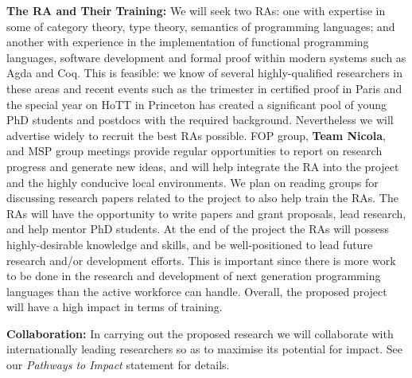 \documentclass[a4paper,11pt]{article}
\begin{document}
{\bf The RA and Their Training:} We will seek two RAs: one with
expertise in some of category theory, type theory, semantics of
programming languages; and another with experience in the
implementation of functional programming languages, software
development and formal proof within modern systems such as Agda and
Coq. This is feasible: we know of several highly-qualified researchers
in these areas and recent events such as the trimester in certified
proof in Paris and the special year on HoTT in Princeton has created a
significant pool of young PhD students and postdocs with the required
background. Nevertheless we will advertise widely to recruit the best RAs
possible. %
FOP group, {\bf Team Nicola}, and MSP group meetings
provide regular opportunities to report on research 
progress and generate new ideas, and will help integrate the RA into
the project and the highly conducive local environments.
We plan on reading groups for discussing research
papers 
related to the project to also help train the RAs. The RAs will have
the opportunity to write papers and grant proposals, lead research,
and help mentor PhD students.  At the end of the project the RAs will
possess highly-desirable knowledge and skills, and be well-positioned
to lead future research and/or development efforts. This is important
since there is more work to be done in the research and development of
next generation programming languages than the active workforce can
handle. Overall, the proposed project will have a high impact in terms
of training.

\vspace*{0.02in}

{\bf Collaboration:} In carrying out the proposed research we will
collaborate with internationally leading researchers so as to maximise
its potential for impact. See our {\em Pathways to
  Impact} statement for details.

\end{document}
